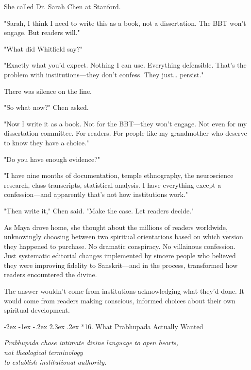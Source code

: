 \documentclass[12pt,twoside]{book}
\makeatletter
\def\cleardoublepage{\clearpage\if@twoside \ifodd\c@page\else\hbox{}\thispagestyle{empty}\newpage\if@twocolumn\hbox{}\newpage\fi\fi\fi}
\renewcommand\section{\@startsection{section}{1}{\z@}%
{-2ex \@plus -1ex \@minus -.2ex}%
{2.3ex \@plus.2ex}%
{\normalfont\Large\bfseries}}
\makeatother
\begin{document}
She called Dr. Sarah Chen at Stanford.

"Sarah, I think I need to write this as a book, not a dissertation. The BBT won't engage. But readers will."

"What did Whitfield say?"

"Exactly what you'd expect. Nothing I can use. Everything defensible. That's the problem with institutions—they don't confess. They just\ldots{} persist."

There was silence on the line.

"So what now?" Chen asked.

"Now I write it as a book. Not for the BBT—they won't engage. Not even for my dissertation committee. For readers. For people like my grandmother who deserve to know they have a choice."

"Do you have enough evidence?"

"I have nine months of documentation, temple ethnography, the neuroscience research, class transcripts, statistical analysis. I have everything except a confession—and apparently that's not how institutions work."

"Then write it," Chen said. "Make the case. Let readers decide."

As Maya drove home, she thought about the millions of readers worldwide, unknowingly choosing between two spiritual orientations based on which version they happened to purchase. No dramatic conspiracy. No villainous confession. Just systematic editorial changes implemented by sincere people who believed they were improving fidelity to Sanskrit—and in the process, transformed how readers encountered the divine.

The answer wouldn't come from institutions acknowledging what they'd done. It would come from readers making conscious, informed choices about their own spiritual development.

\cleardoublepage
\vspace*{0.20\textheight}
\section*{16. What Prabhupāda Actually Wanted}
\thispagestyle{chapterpage}

{\centering\itshape Prabhupāda chose intimate divine language to open hearts,\\not theological terminology\\to establish institutional authority.\par}
\vspace{0.3cm}
\end{document}
